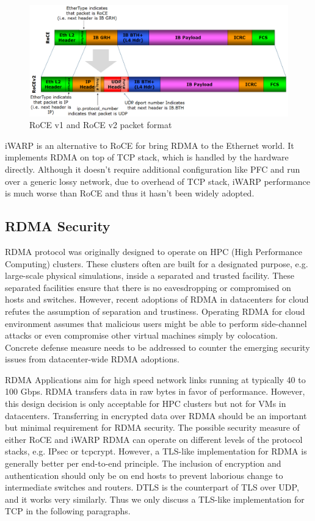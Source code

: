 \begin{figure}[ht]
    \centering
    \includegraphics[width=\textwidth]{fig/RoCE_Header_format}
    \caption{RoCE v1 and RoCE v2 packet format}
    \label{fig:roce_header_format}
\end{figure}

iWARP is an alternative to RoCE for bring RDMA to the Ethernet world. It implements RDMA on top of TCP stack, which is handled by the hardware directly.
Although it doesn't require additional configuration like PFC and run over a generic lossy network,
due to overhead of TCP stack, iWARP performance is much worse than RoCE and thus it hasn't been widely adopted.

\subsection{RDMA Security}

RDMA protocol was originally designed to operate on HPC (High Performance Computing) clusters.
These clusters often are built for a designated purpose, e.g. large-scale physical simulations,
inside a separated and trusted facility. These separated facilities ensure that there is no eavesdropping or compromised on hosts and switches. However, recent adoptions of RDMA in datacenters for cloud refutes the assumption of separation and trustiness. Operating RDMA for cloud environment assumes that malicious users might be able to perform side-channel attacks or even compromise other virtual machines simply by colocation.
Concrete defense measure needs to be addressed to counter the emerging security issues from datacenter-wide RDMA adoptions.

RDMA Applications aim for high speed network links running at typically 40 to 100 Gbps. RDMA transfers data in raw bytes in favor of performance. However, this design decision is only acceptable for HPC clusters but not for VMs in datacenters. Transferring in encrypted data over RDMA should be an important but minimal requirement for RDMA security. The possible security measure of either RoCE and iWARP RDMA can operate on different levels of the protocol stacks, e.g. IPsec or tcpcrypt. However, a TLS-like implementation for RDMA is generally better per end-to-end principle. The inclusion of encryption and authentication should only be on end hosts to prevent laborious change to intermediate switches and routers. DTLS is the counterpart of TLS over UDP, and it works very similarly. Thus we only discuss a TLS-like implementation for TCP in the following paragraphs.

